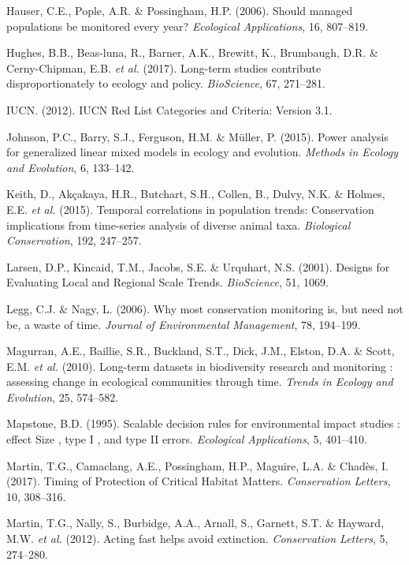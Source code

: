 \documentclass[12pt,]{article}
\begin{document}
\hypertarget{ref-Hauser2006}{}
Hauser, C.E., Pople, A.R. \& Possingham, H.P. (2006). Should managed
populations be monitored every year? \emph{Ecological Applications}, 16,
807--819.

\hypertarget{ref-Hughes2017}{}
Hughes, B.B., Beas-luna, R., Barner, A.K., Brewitt, K., Brumbaugh, D.R.
\& Cerny-Chipman, E.B. \emph{et al.} (2017). Long-term studies
contribute disproportionately to ecology and policy. \emph{BioScience},
67, 271--281.

\hypertarget{ref-IUCN2012}{}
IUCN. (2012). IUCN Red List Categories and Criteria: Version 3.1.

\hypertarget{ref-Johnson2015}{}
Johnson, P.C., Barry, S.J., Ferguson, H.M. \& Müller, P. (2015). Power
analysis for generalized linear mixed models in ecology and evolution.
\emph{Methods in Ecology and Evolution}, 6, 133--142.

\hypertarget{ref-Keith2015}{}
Keith, D., Akçakaya, H.R., Butchart, S.H., Collen, B., Dulvy, N.K. \&
Holmes, E.E. \emph{et al.} (2015). Temporal correlations in population
trends: Conservation implications from time-series analysis of diverse
animal taxa. \emph{Biological Conservation}, 192, 247--257.

\hypertarget{ref-Larsen2001}{}
Larsen, D.P., Kincaid, T.M., Jacobs, S.E. \& Urquhart, N.S. (2001).
Designs for Evaluating Local and Regional Scale Trends.
\emph{BioScience}, 51, 1069.

\hypertarget{ref-Legg2006}{}
Legg, C.J. \& Nagy, L. (2006). Why most conservation monitoring is, but
need not be, a waste of time. \emph{Journal of Environmental
Management}, 78, 194--199.

\hypertarget{ref-Magurran2010}{}
Magurran, A.E., Baillie, S.R., Buckland, S.T., Dick, J.M., Elston, D.A.
\& Scott, E.M. \emph{et al.} (2010). Long-term datasets in biodiversity
research and monitoring : assessing change in ecological communities
through time. \emph{Trends in Ecology and Evolution}, 25, 574--582.

\hypertarget{ref-Mapstone1995}{}
Mapstone, B.D. (1995). Scalable decision rules for environmental impact
studies : effect Size , type I , and type II errors. \emph{Ecological
Applications}, 5, 401--410.

\hypertarget{ref-Martin2017}{}
Martin, T.G., Camaclang, A.E., Possingham, H.P., Maguire, L.A. \&
Chadès, I. (2017). Timing of Protection of Critical Habitat Matters.
\emph{Conservation Letters}, 10, 308--316.

\hypertarget{ref-Martin2012}{}
Martin, T.G., Nally, S., Burbidge, A.A., Arnall, S., Garnett, S.T. \&
Hayward, M.W. \emph{et al.} (2012). Acting fast helps avoid extinction.
\emph{Conservation Letters}, 5, 274--280.
\end{document}
